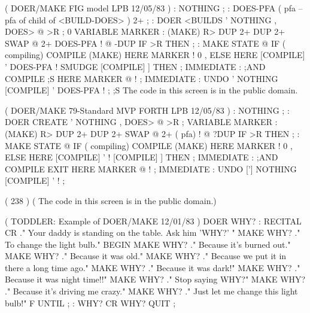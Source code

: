 \vfill
\begin{Screen}
( DOER/MAKE   FIG model                          LPB 12/05/83 )
: NOTHING   ;
: DOES-PFA  ( pfa -- pfa of child of <BUILD-DOES> )   2+ ;
: DOER   <BUILDS  ' NOTHING ,  DOES> @ >R ;
0 VARIABLE MARKER
: (MAKE)  R>  DUP 2+  DUP 2+  SWAP @  2+ DOES-PFA !
   @ -DUP IF >R THEN ;
: MAKE  STATE @ IF ( compiling)
   COMPILE (MAKE)  HERE MARKER !  0 ,
   ELSE  HERE  [COMPILE] '  DOES-PFA !
   SMUDGE    [COMPILE] ] THEN ; IMMEDIATE
: ;AND   COMPILE ;S  HERE MARKER @ ! ;  IMMEDIATE
: UNDO   ' NOTHING  [COMPILE] '  DOES-PFA ! ;
;S
The code in this screen is in the public domain.

\end{Screen}
\vfill
\begin{Screen}
( DOER/MAKE   79-Standard  MVP FORTH             LPB 12/05/83 )
: NOTHING ;
: DOER   CREATE  ' NOTHING  ,  DOES> @ >R ;
VARIABLE MARKER
: (MAKE)  R>  DUP 2+  DUP 2+  SWAP @  2+ ( pfa) !
   @ ?DUP IF >R THEN ;
: MAKE   STATE @ IF ( compiling)
   COMPILE (MAKE)  HERE MARKER !  0 ,
   ELSE  HERE  [COMPILE] ' !
    [COMPILE] ]  THEN ;   IMMEDIATE
: ;AND   COMPILE EXIT  HERE MARKER @ ! ;   IMMEDIATE
: UNDO   ['] NOTHING  [COMPILE] ' ! ;

( 238 )
( The code in this screen is in the public domain.)

\end{Screen}
\vfill
\begin{Screen}
( TODDLER: Example of DOER/MAKE                     12/01/83 )
DOER WHY?
: RECITAL
  CR ." Your daddy is standing on the table.  Ask him 'WHY?' "
   MAKE WHY? ." To change the light bulb."
  BEGIN
  MAKE WHY?  ." Because it's burned out."
  MAKE WHY?  ." Because it was old."
  MAKE WHY?  ." Because we put it in there a long time ago."
  MAKE WHY?  ." Because it was dark!"
  MAKE WHY?  ." Because it was night time!!"
  MAKE WHY?  ." Stop saying WHY?"
  MAKE WHY?  ." Because it's driving me crazy."
  MAKE WHY?  ." Just let me change this light bulb!"
  F UNTIL ;
: WHY?   CR  WHY?  QUIT ;
\end{Screen}
\vfill